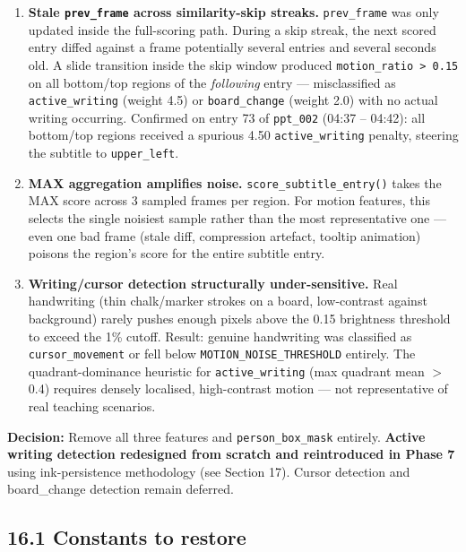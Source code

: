 \documentclass[11pt]{article}
\begin{document}
\begin{enumerate}[leftmargin=1.2em]
    \item \textbf{Stale \texttt{prev\_frame} across similarity-skip streaks.} \texttt{prev\_frame} was only updated inside the full-scoring path. During a skip streak, the next scored entry diffed against a frame potentially several entries and several seconds old. A slide transition inside the skip window produced \texttt{motion\_ratio > 0.15} on all bottom/top regions of the \emph{following} entry --- misclassified as \texttt{active\_writing} (weight 4.5) or \texttt{board\_change} (weight 2.0) with no actual writing occurring. Confirmed on entry 73 of \texttt{ppt\_002} (04:37 -- 04:42): all bottom/top regions received a spurious 4.50 \texttt{active\_writing} penalty, steering the subtitle to \texttt{upper\_left}.

    \item \textbf{MAX aggregation amplifies noise.} \texttt{score\_subtitle\_entry()} takes the MAX score across 3 sampled frames per region. For motion features, this selects the single noisiest sample rather than the most representative one --- even one bad frame (stale diff, compression artefact, tooltip animation) poisons the region's score for the entire subtitle entry.

    \item \textbf{Writing/cursor detection structurally under-sensitive.} Real handwriting (thin chalk/marker strokes on a board, low-contrast against background) rarely pushes enough pixels above the 0.15 brightness threshold to exceed the 1\% cutoff. Result: genuine handwriting was classified as \texttt{cursor\_movement} or fell below \texttt{MOTION\_NOISE\_THRESHOLD} entirely. The quadrant-dominance heuristic for \texttt{active\_writing} (max quadrant mean $>$ 0.4) requires densely localised, high-contrast motion --- not representative of real teaching scenarios.
\end{enumerate}

\textbf{Decision:} Remove all three features and \texttt{person\_box\_mask} entirely. \textbf{Active writing detection redesigned from scratch and reintroduced in Phase 7} using ink-persistence methodology (see Section 17). Cursor detection and board\_change detection remain deferred.

\subsection*{16.1 Constants to restore}
\end{document}
